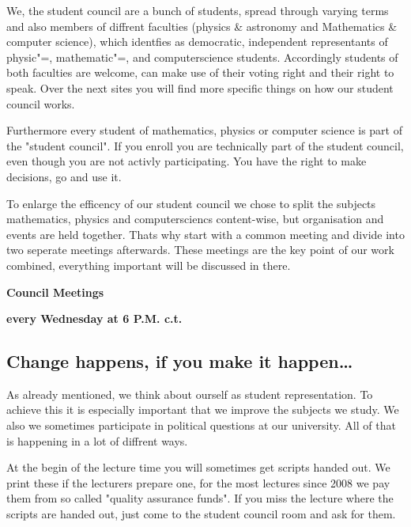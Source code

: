 We, the student council are a bunch of students, spread through varying terms and also members of diffrent faculties (physics \& astronomy and Mathematics \& computer science), which identfies as democratic, independent representants of physic"=, mathematic"=, and computerscience students. Accordingly students of both faculties are welcome, can make use of their voting right and their right to speak. Over the next sites you will find more specific things on how our student council works.

Furthermore every student of mathematics, physics or computer science is part of the "student council". If you enroll you are technically part of the student council, even though you are not activly participating. You have the right to make decisions, go and use it.

To enlarge the efficency of our student council we chose to split the subjects mathematics, physics and computersciencs content-wise, but organisation and events are held together. Thats why start with a common meeting and divide into two seperate meetings afterwards. These meetings are the key point of our work combined, everything important will be discussed in there. 

\begin{center}
\large
\textbf{Council Meetings}

\textbf{every Wednesday at 6 P.M. \gls{c.t.}}
\end{center}


\subsection{Change happens, if you make it happen\dots}
As already mentioned, we think about ourself as student representation. To achieve this it is especially important that we improve the subjects we study. We also we sometimes participate in political questions at our university. All of that is happening in a lot of diffrent ways.

At the begin of the lecture time you will sometimes get scripts handed out. We print these if the lecturers prepare one, for the most lectures since 2008 we pay them from so called "quality assurance funds". If you miss the lecture where the scripts are handed out, just come to the student council room and ask for them.

